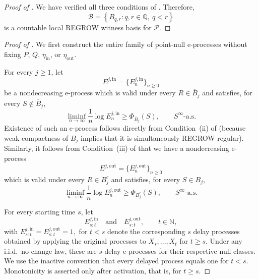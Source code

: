 \documentclass[12pt]{article}
\theoremstyle{spaced}
\theoremstyle{remark}
\newcommand{\N}{\mathbb N}
\begin{document}
\begin{proof}[Proof of ]
We have verified all three conditions of
. Therefore,
\[
    \mathscr B
    =
    \left\{
        B_{q,r}:q,r\in\mathbb Q,\ q<r
    \right\}
\]
is a countable local REGROW witness basis for
$\mathcal P$.
\end{proof}




\begin{proof}[Proof of ]
We first construct the entire family of point-null e-processes
without fixing $P$, $Q$, $\eta_{\mathrm{in}}$, or
$\eta_{\mathrm{out}}$.

For every $j\ge1$, let
\[
    E^{j,\mathrm{in}}
    =
    \{E_n^{j,\mathrm{in}}\}_{n\ge0}
\] 
be a
nondecreasing e-process
which is valid under every $R\in\overline B_j$ and satisfies,
for every $S\notin\overline B_j$,
\[
    \liminf_{n\to\infty}
    \frac1n\log E_n^{j,\mathrm{in}}
    \ge
    \Phi_{\overline B_j}(S),
    \qquad
    S^\infty\text{-a.s.}
\]
Existence of such an e-process follows directly from
Condition~\textup{(ii)} of
 (because weak compactness of $B_j$ implies that it is simultaneously REGROW-regular). Similarly, it follows from
Condition~\textup{(iii)} of
 that we have
a nondecreasing e-process
\[
    E^{j,\mathrm{out}}
    =
    \{E_n^{j,\mathrm{out}}\}_{n\ge0}
\]
which is valid under every $R\in B_j^c$ and satisfies, for every
$S\in B_j$,
\[
    \liminf_{n\to\infty}
    \frac1n\log E_n^{j,\mathrm{out}}
    \ge
    \Phi_{B_j^c}(S),
    \qquad
    S^\infty\text{-a.s.}
\]

For every starting time $s$, let
\[
    E_{s:t}^{j,\mathrm{in}}
    \quad\text{and}\quad
    E_{s:t}^{j,\mathrm{out}},
    \qquad t\in\N,
\]
with $E_{s:t}^{j,\mathrm{in}}
   =
    E_{s:t}^{j,\mathrm{out}}=1, $ for $t< s$
denote the corresponding $s$ delay processes obtained by
applying the original processes to
$X_s,\ldots,X_t$ for $t\geq s$.
Under any i.i.d.\ no-change law, these are $s$-delay
e-processes for their respective null classes. We use the
inactive convention that every delayed process equals one for
$t<s$. Monotonicity is asserted only after activation, that is,
for $t\ge s$.


\end{proof}
\end{document}

